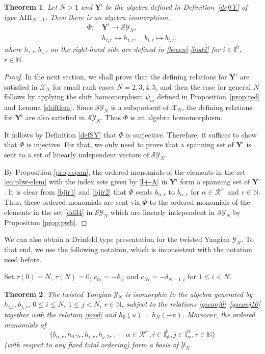 \documentclass[11pt,reqno]{amsart}
\numberwithin{equation}{section}
\newtheorem{thm}{Theorem}[section]
\theoremstyle{definition}
\theoremstyle{remark}
\newcommand{\beq}{\begin{equation}}
\newcommand{\eeq}{\end{equation}}
\newcommand{\bN}{\mathbb{N}}
\newcommand{\mc}{\mathcal}
\newcommand{\cR}{\mathcal{R}}
\newcommand{\lle}{\leqslant}
\newcommand{\Y}{{\mathscr{Y}}}
\newcommand{\scrX}{{\mathscr{X}}}
\newcommand{\SY}{{\mathscr{SY}}}
\newcommand{\Yi}{{\mathbf{Y}^\imath}}
\def \I{\mathbb{I}}
\def \N{\mathbb{N}}
\begin{document}
\begin{thm}\label{main2}
Let $N>1$ and $\Yi$ be the algebra defined in Definition~\ref{deftY} of type $\mathrm{AIII}_{N-1}$. Then there is an algebra isomorphism,
\beq\label{isoexp}
\begin{split}
\Phi: &\,\Yi\to \SY_{N},\\
&\, h_{i,r}\mapsto h_{i,r},\quad b_{i,r}\mapsto b_{i,r},
\end{split}
\eeq
where $h_{i,r},b_{i,r}$ on the right-hand side are defined in \eqref{beven}-\eqref{hodd} for $i\in \I^0$, $r\in\bN$.
\end{thm}
\begin{proof}
In the next section, we shall prove that the defining relations for $\Yi$ are satisfied in $\scrX_{N}$ for small rank cases $N=2,3,4,5$, and then the case for general $N$ follows by applying the shift homomorphism $\psi_m$ defined in Proposition~\ref{prop:red} and Lemma \ref{shiftlem}. Since $\SY_N$ is a subquotient of $\scrX_N$, the defining relations for $\Yi$ are also satisfied in $\SY_{N}$. Thus $\Phi$ is an algebra homomorphism. 

It follows by Definition \ref{defSY} that $\Phi$ is surjective. Therefore, it suffices to show that $\Phi$ is injective. For that, we only need to prove that a spanning set of $\Yi$ is sent to a set of linearly independent vectors of $\SY_{N}$. 

By Proposition \ref{prop:span}, the ordered monomials of the elements in the set \eqref{eq:pbw-elem} with the index sets given by \eqref{I+-A} in $\Yi$ form a spanning set of $\Yi$. It is clear from \eqref{bjir1} and \eqref{bjir2} that $\Phi$ sends $b_{\alpha,r}$ to $b_{\alpha,r}$ for $\alpha\in\mc R^+$ and $r\in\bN$. Thus, these ordered monomials are sent via $\Phi$ to the ordered monomials of the elements in the set \eqref{dd34} in $\SY_N$ which are linearly independent in $\SY_N$ by Proposition \ref{prop:pwb}.
\end{proof}

We can also obtain a Drinfeld type presentation for the twisted Yangian $\Y_N$. To that end, we use the following notation, which is inconsistent with the notation used before.  

Set $\tau(0)=N$, $\tau(N)=0$, $c_{0i}=-\delta_{1i}$ and $c_{Ni}=-\delta_{N-1,i}$ for $1\lle i<N$.

\begin{thm}\label{main3}
The twisted Yangian $\Y_N$ is isomorphic to the algebra generated by $h_{i,r},b_{j,r}$, $0\lle i\lle N$, $1\lle j<N$, $r\in\bN$, subject to the relations \eqref{qsconj0}--\eqref{qsconj10} together with the relation \eqref{prod} and $h_0(u)=h_{N}(-u)$. Moreover, the ordered monomials of 
\beq\label{ggen}
\{b_{\alpha,r},h_{0,2r},h_{i,r},h_{j,2r+1}~|~\alpha\in\cR^+,i\in\I^0_{\ne},j\in\I_{=}^0,r\in\N\}
\eeq
(with respect to any fixed total ordering) form a basis of $\Y_N$.
\end{thm}
\end{document}
